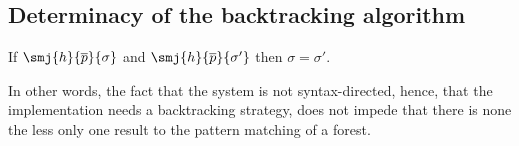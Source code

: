 
\subsection{Determinacy of the backtracking algorithm}
\label{backtracking:determinacy}

\begin{theorem}[Determinacy]\hfill
\begin{center}
If \(\smj{h}{\overline{p}}{\sigma}\)
and \(\smj{h}{\overline{p}}{\sigma'}\)
then \(\sigma = \sigma'\).
\end{center}
\end{theorem}
\noindent In other words, the fact that the system is not
syntax\hyp{}directed, hence, that the implementation needs a
backtracking strategy, does not impede that there is none the less
only one result to the pattern matching of a forest.


